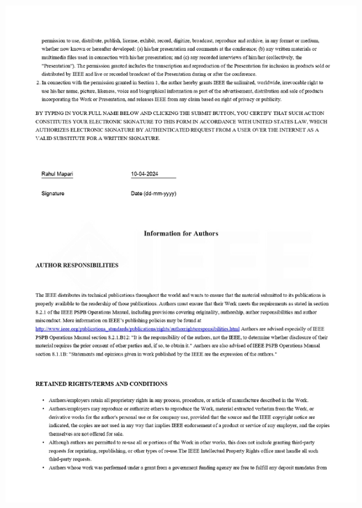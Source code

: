 \documentclass[12pt,a4paper]{report}
\begin{document}
\includegraphics[scale=0.7]{images/copyright/publication/PublicationCopyright/PublicationCopyright_page-0002.jpg}
\newpage
\end{document}
